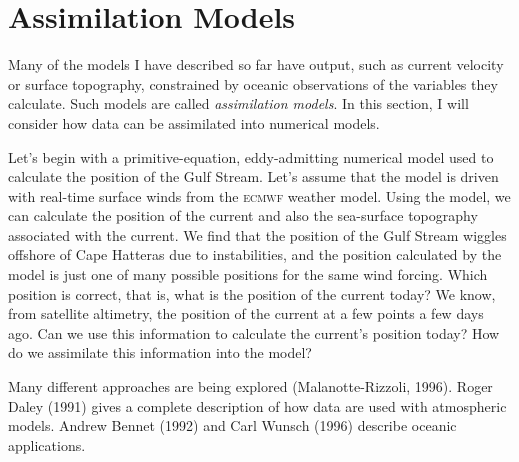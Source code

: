 \section{Assimilation Models}
Many of the models I have described so far have output, such as current velocity or surface topography, constrained by oceanic observations of the variables they calculate. Such models are called \textit{assimilation models}. In this section, I will consider how data can be assimilated into numerical models.

Let's begin with a primitive-equation, eddy-admitting numerical model used to calculate the position of the Gulf Stream. Let's assume that the model is driven with real-time surface winds from the \textsc{ecmwf} weather model. Using the model, we can calculate the position of the current and also the sea-surface topography associated with the current.  We find that the position of the Gulf Stream wiggles offshore of Cape Hatteras due to instabilities, and the position calculated by the model is just one of many possible positions for the same wind forcing. Which position is correct, that is, what is the position of the current today? We know, from satellite altimetry, the position of the current at a few points a few days ago. Can we use this information to calculate the current's position today? How do we assimilate this information into the model?

Many different approaches are being explored (Malanotte-Rizzoli, 1996). Roger Daley (1991) gives a complete description of how data are used with atmospheric models. Andrew Bennet (1992) and Carl Wunsch (1996) describe oceanic applications.

